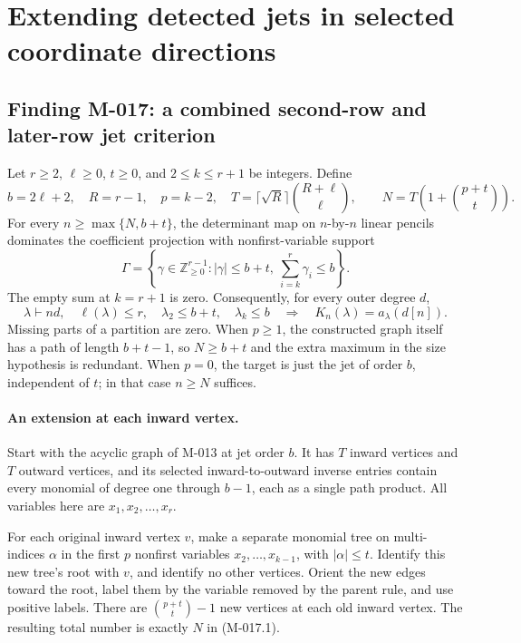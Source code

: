 \section{Extending detected jets in selected coordinate directions}

\subsection*{Finding M-017: a combined second-row and later-row jet criterion}
Let \(r\geq2\), \(\ell\geq0\), \(t\geq0\), and
\(2\leq k\leq r+1\) be integers. Define
\[
 b=2\ell+2,\quad R=r-1,\quad p=k-2,\quad
 T=\lceil\sqrt R\rceil\binom{R+\ell}{\ell},\qquad
 N=T\left(1+\binom{p+t}{t}\right).
                                                               \tag{M-017.1}
\]
For every \(n\geq\max\{N,b+t\}\), the determinant
map on \(n\)-by-\(n\) linear pencils dominates the
coefficient projection with nonfirst-variable support
\[
 \Gamma=\left\{\gamma\in\mathbb Z_{\geq0}^{r-1}:
       |\gamma|\leq b+t,
       \ \sum_{i=k}^r\gamma_i\leq b\right\}.
                                                               \tag{M-017.2}
\]
The empty sum at \(k=r+1\) is zero. Consequently,
for every outer degree \(d\),
\begin{equation}\label{eq:M017K}
 \lambda\vdash nd,\quad\ell(\lambda)\leq r,\quad
 \lambda_2\leq b+t,\quad\lambda_k\leq b
       \quad\Longrightarrow\quad K_n(\lambda)=a_\lambda(d[n]).
\end{equation}
Missing parts of a partition are zero. When \(p\geq1\),
the constructed graph itself has a path of length \(b+t-1\),
so \(N\geq b+t\) and the extra maximum in the size
hypothesis is redundant. When \(p=0\), the target is just
the jet of order \(b\), independent of \(t\); in that
case \(n\geq N\) suffices.

\paragraph{An extension at each inward vertex.}
Start with the acyclic graph of M-013 at jet order \(b\).
It has \(T\) inward vertices and \(T\) outward vertices,
and its selected inward-to-outward inverse entries contain
every monomial of degree one through \(b-1\), each as
a single path product. All variables here are
\(x_1,x_2,\ldots,x_r\).

For each original inward vertex \(v\), make a separate
monomial tree on multi-indices \(\alpha\) in the first
\(p\) nonfirst variables \(x_2,\ldots,x_{k-1}\), with
\(|\alpha|\leq t\). Identify this new tree's root
with \(v\), and identify no other vertices. Orient the
new edges toward the root, label them by the variable
removed by the parent rule, and use positive labels.
There are \(\binom{p+t}{t}-1\) new vertices at each
old inward vertex. The resulting total number is exactly
\(N\) in (M-017.1).

